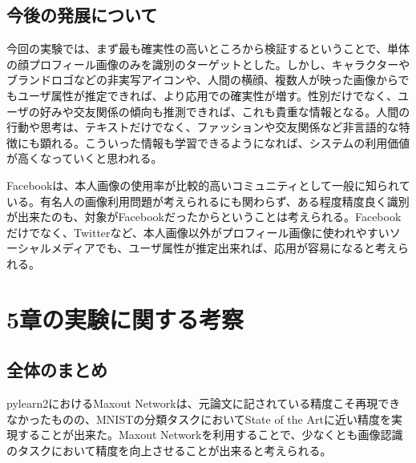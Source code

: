 \subsection{今後の発展について}
今回の実験では、まず最も確実性の高いところから検証するということで、単体の顔プロフィール画像のみを識別のターゲットとした。しかし、キャラクターやブランドロゴなどの非実写アイコンや、人間の横顔、複数人が映った画像からでもユーザ属性が推定できれば、より応用での確実性が増す。性別だけでなく、ユーザの好みや交友関係の傾向も推測できれば、これも貴重な情報となる。人間の行動や思考は、テキストだけでなく、ファッションや交友関係など非言語的な特徴にも顕れる。こういった情報も学習できるようになれば、システムの利用価値が高くなっていくと思われる。\par
Facebookは、本人画像の使用率が比較的高いコミュニティとして一般に知られている。有名人の画像利用問題が考えられるにも関わらず、ある程度精度良く識別が出来たのも、対象がFacebookだったからということは考えられる。Facebookだけでなく、Twitterなど、本人画像以外がプロフィール画像に使われやすいソーシャルメディアでも、ユーザ属性が推定出来れば、応用が容易になると考えられる。

\section{5章の実験に関する考察}
\subsection{全体のまとめ}
pylearn2におけるMaxout Networkは、元論文に記されている精度こそ再現できなかったものの、MNISTの分類タスクにおいてState of the Artに近い精度を実現することが出来た。Maxout Networkを利用することで、少なくとも画像認識のタスクにおいて精度を向上させることが出来ると考えられる。\par
